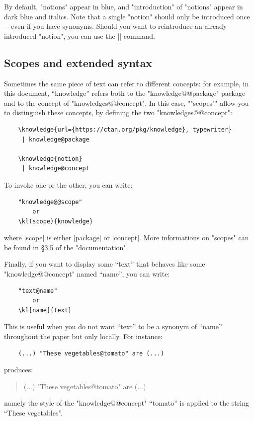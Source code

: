 \documentclass{article}
\begin{document}
By default, "notions" appear in blue, and "introduction" of "notions"
appear in dark blue and italics.
Note that a single "notion" should only be introduced once---even if you have synonyms. Should you want to reintroduce an already introduced "notion", 
you can use the \spverb|| command.

\subsection{Scopes and extended syntax}

Sometimes the same piece of text can refer to different concepts: for example, in this document, ``knowledge'' refers both to the "knowledge@@package" package
and to the concept of "knowledges@@concept". In this case, \AP""scopes"" allow 
you to distinguish these concepts, by defining the two "knowledges@@concept":
\begin{verbatim}
    \knowledge{url={https://ctan.org/pkg/knowledge}, typewriter}
     | knowledge@package

    \knowledge{notion}
     | knowledge@concept
\end{verbatim}
To invoke one or the other, you can write:
%
\begin{verbatim}
    "knowledge@@scope"
        or
    \kl(scope){knowledge}
\end{verbatim}
%
where \spverb|scope| is either \spverb|package| or
\spverb|concept|.
More informations on "scopes" can be found in \href{https://ctan.mines-albi.fr/macros/latex/contrib/knowledge/knowledge.pdf#subsection.3.5}{§3.5} of the "documentation".

Finally, if you want to display some ``text'' that behaves
like some "knowledge@@concept" named ``name'', you can write:
%
\begin{verbatim}
    "text@name"
        or
    \kl[name]{text}
\end{verbatim}
%
This is useful when you do not want ``text'' to be a synonym
of ``name'' throughout the paper but only locally.
For instance:
%
\begin{verbatim}
    (...) "These vegetables@tomato" are (...)
\end{verbatim}
%
produces:
\begin{quote}
    (...) "These vegetables@tomato" are (...)
\end{quote}
namely the style of the "knowledge@@concept" ``tomato'' is applied to the
string ``These vegetables''.
\end{document}
